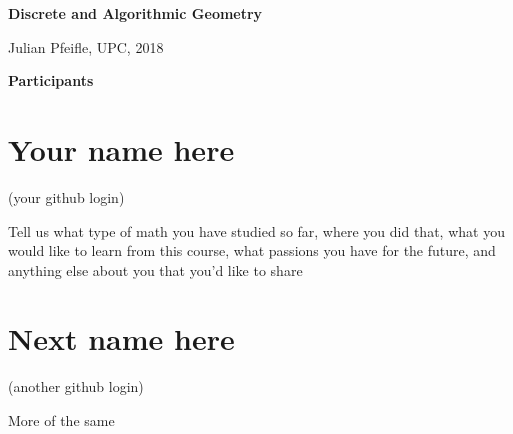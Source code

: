 \documentclass[11pt]{amsart}
\begin{document}
\begin{center}
\textbf{\sffamily
   Discrete and Algorithmic Geometry }

\medskip
   Julian Pfeifle,
   UPC, 2018
\end{center}

\bigskip

\begin{center}
  \textbf{\sffamily Participants}
\end{center}

\medskip

\section*{Your name here}
(your github login)

Tell us what type of math you have studied so far, where you did that, what you would like to learn from this course, what passions you have for the future, and anything else about you that you'd like to share

\medskip

\section*{Next name here}
(another github login)

More of the same
\end{document}
